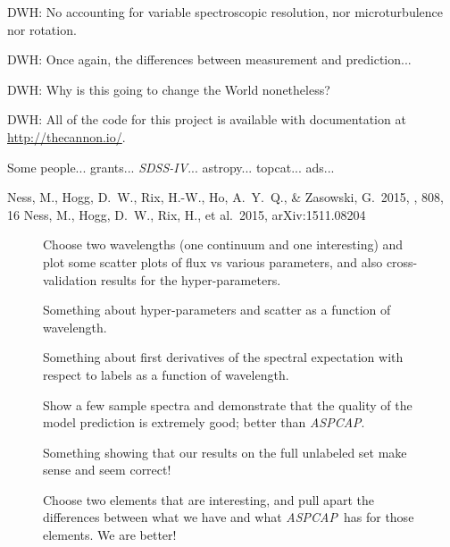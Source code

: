 \documentclass[12pt,preprint]{aastex}
\newcommand{\project}[1]{\textsl{#1}}
\newcommand{\acronym}[1]{{\small{#1}}}
\newcommand{\sdss}{\project{\acronym{SDSS-IV}}}
\newcommand{\aspcap}{\project{\acronym{ASPCAP}}}
\begin{document}
DWH: No accounting for variable spectroscopic resolution, nor
microturbulence nor rotation.

DWH:  Once again, the differences between measurement and prediction...

DWH:  Why is this going to change the World nonetheless?

DWH: All of the code for this project is available with documentation
at \url{http://thecannon.io/}.

\acknowledgements
Some people...
grants...
\sdss...
astropy... topcat... ads...

\begin{thebibliography}{dummy}\raggedright
{} Ness, M., Hogg, D.~W., 
Rix, H.-W., Ho, A.~Y.~Q., \& Zasowski, G.\ 2015, \apj, 808, 16
 Ness, M., Hogg, D.~W., 
Rix, H., et al.\ 2015, arXiv:1511.08204 
\end{thebibliography}

\clearpage

\begin{figure}[p]
\caption{Choose two wavelengths (one continuum and one interesting)
  and plot some scatter plots of flux vs various parameters, and also
  cross-validation results for the
  hyper-parameters.\label{fig:onewavelength}}
\end{figure}

\begin{figure}[p]
\caption{Something about hyper-parameters and scatter as a function of
  wavelength.\label{fig:hyperpars}}
\end{figure}

\begin{figure}[p]
\caption{Something about first derivatives of the spectral expectation
  with respect to labels as a function of
  wavelength.\label{fig:derivatives}}
\end{figure}

\begin{figure}[p]
\caption{Show a few sample spectra and demonstrate that the quality of
  the model prediction is extremely good; better than
  \aspcap.\label{fig:correctness}}
\end{figure}

\begin{figure}[p]
\caption{Something showing that our results on the full unlabeled set
  make sense and seem correct!\label{fig:fulltest}}
\end{figure}

\begin{figure}[p]
\caption{Choose two elements that are interesting, and pull apart the
  differences between what we have and what \aspcap\ has for those
  elements.  We are better!\label{fig:elements}}
\end{figure}
\end{document}
